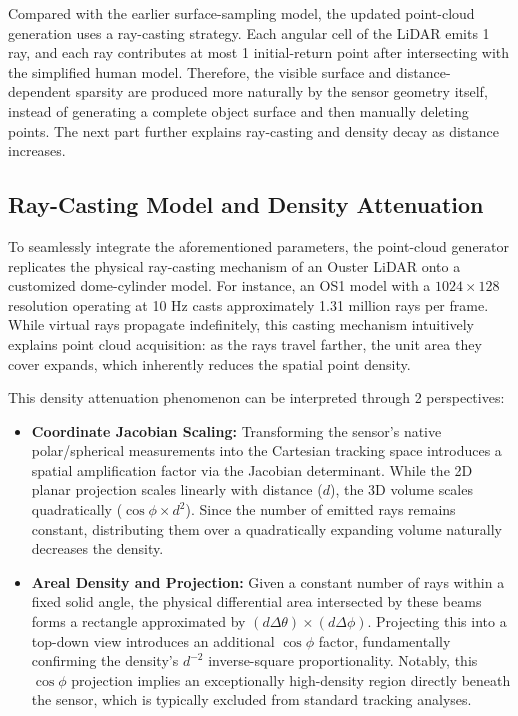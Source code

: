 \documentclass[11pt,a4paper]{report}
\begin{document}
\begin{contentbox}
\vspace{0.35em}

Compared with the earlier surface-sampling model, the updated point-cloud generation uses a ray-casting strategy. Each angular cell of the LiDAR emits 1 ray, and each ray contributes at most 1 initial-return point after intersecting with the simplified human model. Therefore, the visible surface and distance-dependent sparsity are produced more naturally by the sensor geometry itself, instead of generating a complete object surface and then manually deleting points. The next part further explains ray-casting and density decay as distance increases.
\newpage

\subsection*{Ray-Casting Model and Density Attenuation}

To seamlessly integrate the aforementioned parameters, the point-cloud generator replicates the physical ray-casting mechanism of an Ouster LiDAR onto a customized dome-cylinder model. For instance, an OS1 model with a $1024 \times 128$ resolution operating at 10 Hz casts approximately 1.31 million rays per frame. While virtual rays propagate indefinitely, this casting mechanism intuitively explains point cloud acquisition: as the rays travel farther, the unit area they cover expands, which inherently reduces the spatial point density.

This density attenuation phenomenon can be interpreted through 2 perspectives:
\begin{itemize}
    \item \textbf{Coordinate Jacobian Scaling:} Transforming the sensor's native polar/spherical measurements into the Cartesian tracking space introduces a spatial amplification factor via the Jacobian determinant. While the 2D planar projection scales linearly with distance ($d$), the 3D volume scales quadratically ($\cos\phi \times d^2$). Since the number of emitted rays remains constant, distributing them over a quadratically expanding volume naturally decreases the density.
    \item \textbf{Areal Density and Projection:} Given a constant number of rays within a fixed solid angle, the physical differential area intersected by these beams forms a rectangle approximated by $(d \Delta\theta) \times (d \Delta\phi)$. Projecting this into a top-down view introduces an additional $\cos\phi$ factor, fundamentally confirming the density's $d^{-2}$ inverse-square proportionality. Notably, this $\cos\phi$ projection implies an exceptionally high-density region directly beneath the sensor, which is typically excluded from standard tracking analyses.
\end{itemize}


\end{contentbox}
\end{document}
